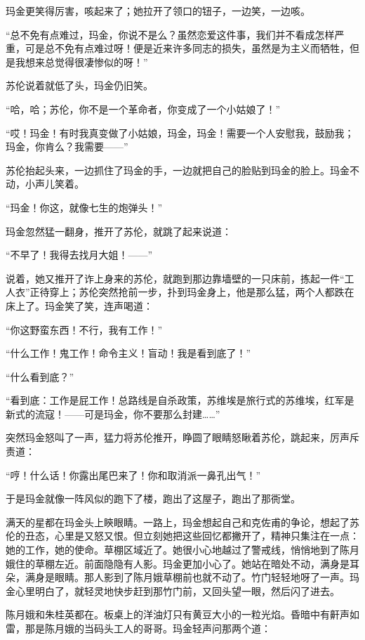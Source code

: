 \par 玛金更笑得厉害，咳起来了；她拉开了领口的钮子，一边笑，一边咳。
\par “总不免有点难过，玛金，你说不是么？虽然恋爱这件事，我们并不看成怎样严重，可是总不免有点难过呀！便是近来许多同志的损失，虽然是为主义而牺牲，但是我想来总觉得很凄惨似的呀！”
\par 苏伦说着就低了头，玛金仍旧笑。
\par “哈，哈；苏伦，你不是一个革命者，你变成了一个小姑娘了！”
\par “哎！玛金！有时我真变做了小姑娘，玛金，玛金！需要一个人安慰我，鼓励我；玛金，你肯么？我需要——”
\par 苏伦抬起头来，一边抓住了玛金的手，一边就把自己的脸贴到玛金的脸上。玛金不动，小声儿笑着。
\par “玛金！你这，就像七生的炮弹头！”
\par 玛金忽然猛一翻身，推开了苏伦，就跳了起来说道：
\par “不早了！我得去找月大姐！——”
\par 说着，她又推开了诈上身来的苏伦，就跑到那边靠墙壁的一只床前，拣起一件“工人衣”正待穿上；苏伦突然抢前一步，扑到玛金身上，他是那么猛，两个人都跌在床上了。玛金笑了笑，连声喝道：
\par “你这野蛮东西！不行，我有工作！”
\par “什么工作！鬼工作！命令主义！盲动！我是看到底了！”
\par “什么看到底？”
\par “看到底：工作是屁工作！总路线是自杀政策，苏维埃是旅行式的苏维埃，红军是新式的流寇！——可是玛金，你不要那么封建……”
\par 突然玛金怒叫了一声，猛力将苏伦推开，睁圆了眼睛怒瞅着苏伦，跳起来，厉声斥责道：
\par “哼！什么话！你露出尾巴来了！你和取消派一鼻孔出气！”
\par 于是玛金就像一阵风似的跑下了楼，跑出了这屋子，跑出了那衖堂。
\par 满天的星都在玛金头上鿃眼睛。一路上，玛金想起自己和克佐甫的争论，想起了苏伦的丑态，心里是又怒又恨。但立刻她把这些回忆都撇开了，精神只集注在一点：她的工作，她的使命。草棚区域近了。她很小心地越过了警戒线，悄悄地到了陈月娥住的草棚左近。前面隐隐有人影。玛金更加小心了。她站在暗处不动，满身是耳朵，满身是眼睛。那人影到了陈月娥草棚前也就不动了。竹门轻轻地呀了一声。玛金心里明白了，就轻灵地快步赶到那竹门前，又回头望一眼，然后闪了进去。
\par 陈月娥和朱桂英都在。板桌上的洋油灯只有黄豆大小的一粒光焰。昏暗中有鼾声如雷，那是陈月娥的当码头工人的哥哥。玛金轻声问那两个道：
